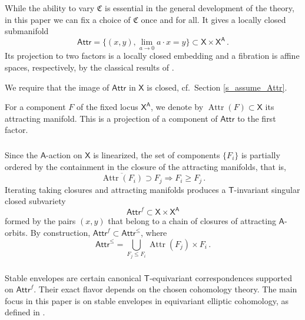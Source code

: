 \documentclass[14pt]{extarticle}
\newcommand{\bT}{\mathsf{T}}
\newcommand{\bA}{\mathsf{A}}
\newcommand{\bX}{\mathsf{X}}
\newcommand{\fC}{\mathfrak{C}}
\newcommand{\fAttr}{\Attr^f}
\newcommand{\Attrc}{\Attr^{\le}}
\newcommand{\Attr}{\mathsf{Attr}}
\DeclareMathOperator{\sAttr}{Attr}
\theoremstyle{definition}
\begin{document}
\subsubsection{} \label{s_Attr_closed} 

While the ability to vary
$\fC$ is essential in the general development of the theory, in
this paper we can fix a choice of $\fC$ once and for all.  It gives
a locally closed submanifold
$$
\Attr = \{(x,y), \lim_{a\to 0} a\cdot x = y\} \subset \bX \times \bX^\bA
\,. 
$$
Its projection to two factors is a locally closed embedding and a
fibration is affine spaces, respectively, by the classical results of
\cite{BB}.

We require that the image of $\Attr$ in $\bX$ is closed, cf.\ Section
\ref{s_assume_Attr}. 

For a component $F$ of the fixed locus $\bX^\bA$, we denote
by $\sAttr(F) \subset \bX$ its attracting manifold. This is a
projection of a component of $\Attr$ to the first factor. 

\subsubsection{} \label{s_partial} 

Since the $\bA$-action on
$\bX$ is linearized, the set of components $\{F_i\}$ is partially
ordered by the containment in the closure of the attracting
manifolds, that is,
%
\begin{equation}
\overline{\sAttr(F_i)} \supset F_j  \Rightarrow F_i \ge F_j
\,.\label{part_order}
\end{equation}
%
Iterating taking closures and attracting manifolds produces
a $\bT$-invariant singular closed subvariety
%
\begin{equation}
\fAttr \subset \bX \times \bX^\bA\label{fAttr}
\end{equation}
%
 formed by the pairs 
$(x,y)$ that belong to a chain of closures of attracting
$\bA$-orbits.
By construction, $\fAttr \subset \Attrc$, where 
%
\begin{equation}
\Attrc = \bigcup_{F_j \le F_i} \sAttr(F_j) \times F_i \,.\label{Attrc}
\end{equation}
%


\subsubsection{} 

Stable envelopes are certain canonical $\bT$-equivariant
correspondences supported on $\Attr^f$.  Their exact flavor
depends on the chosen cohomology theory. 
The main focus in this
paper is on stable envelopes in equivariant elliptic cohomology, as
defined
in \cite{ese}. 
\end{document}
